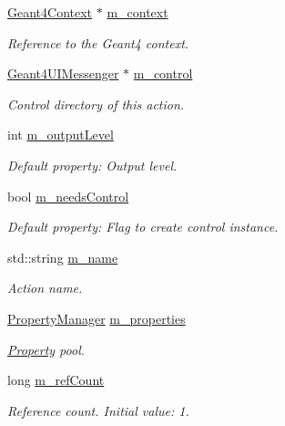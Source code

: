 \begin{DoxyCompactItemize}
\item 
\hyperlink{class_d_d4hep_1_1_simulation_1_1_geant4_context}{Geant4\+Context} $\ast$ \hyperlink{class_d_d4hep_1_1_simulation_1_1_geant4_action_a5cdb706a8dea3dea288b5b9f65398c1d}{m\+\_\+context}
\begin{DoxyCompactList}\small\item\em Reference to the Geant4 context. \end{DoxyCompactList}\item 
\hyperlink{class_d_d4hep_1_1_simulation_1_1_geant4_u_i_messenger}{Geant4\+U\+I\+Messenger} $\ast$ \hyperlink{class_d_d4hep_1_1_simulation_1_1_geant4_action_aff23910feb64988b85e08b1faff251f4}{m\+\_\+control}
\begin{DoxyCompactList}\small\item\em Control directory of this action. \end{DoxyCompactList}\item 
int \hyperlink{class_d_d4hep_1_1_simulation_1_1_geant4_action_a6dc880b8e55e2dada947ad06d7678dd4}{m\+\_\+output\+Level}
\begin{DoxyCompactList}\small\item\em Default property\+: Output level. \end{DoxyCompactList}\item 
bool \hyperlink{class_d_d4hep_1_1_simulation_1_1_geant4_action_a4d64f5159d58c4a43d74d0ddd0a695ba}{m\+\_\+needs\+Control}
\begin{DoxyCompactList}\small\item\em Default property\+: Flag to create control instance. \end{DoxyCompactList}\item 
std\+::string \hyperlink{class_d_d4hep_1_1_simulation_1_1_geant4_action_adb04332ff4e52bce5b9ae1a5848b5d5e}{m\+\_\+name}
\begin{DoxyCompactList}\small\item\em Action name. \end{DoxyCompactList}\item 
\hyperlink{class_d_d4hep_1_1_property_manager}{Property\+Manager} \hyperlink{class_d_d4hep_1_1_simulation_1_1_geant4_action_a30ee75af74df39aa7b34946c59da17ba}{m\+\_\+properties}
\begin{DoxyCompactList}\small\item\em \hyperlink{class_d_d4hep_1_1_property}{Property} pool. \end{DoxyCompactList}\item 
long \hyperlink{class_d_d4hep_1_1_simulation_1_1_geant4_action_a5ea9f95e6db274a1515b947b4f69da9e}{m\+\_\+ref\+Count}
\begin{DoxyCompactList}\small\item\em Reference count. Initial value\+: 1. \end{DoxyCompactList}\end{DoxyCompactItemize}



